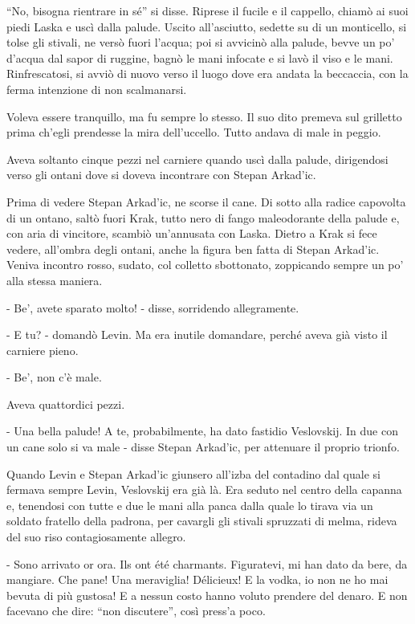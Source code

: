``No, bisogna rientrare in sé'' si disse. Riprese il fucile e il cappello, chiamò ai suoi piedi Laska e uscì dalla palude. Uscito all'asciutto, sedette su di un monticello, si tolse gli stivali, ne versò fuori l'acqua; poi si avvicinò alla palude, bevve un po' d'acqua dal sapor di ruggine, bagnò le mani infocate e si lavò il viso e le mani. Rinfrescatosi, si avviò di nuovo verso il luogo dove era andata la beccaccia, con la ferma intenzione di non scalmanarsi. 

Voleva essere tranquillo, ma fu sempre lo stesso. Il suo dito premeva sul grilletto prima ch'egli prendesse la mira dell'uccello. Tutto andava di male in peggio. 

Aveva soltanto cinque pezzi nel carniere quando uscì dalla palude, dirigendosi verso gli ontani dove si doveva incontrare con Stepan Arkad'ic. 

Prima di vedere Stepan Arkad'ic, ne scorse il cane. Di sotto alla radice capovolta di un ontano, saltò fuori Krak, tutto nero di fango maleodorante della palude e, con aria di vincitore, scambiò un'annusata con Laska. Dietro a Krak si fece vedere, all'ombra degli ontani, anche la figura ben fatta di Stepan Arkad'ic. Veniva incontro rosso, sudato, col colletto sbottonato, zoppicando sempre un po' alla stessa maniera. 

- Be', avete sparato molto! - disse, sorridendo allegramente. 

- E tu? - domandò Levin. Ma era inutile domandare, perché aveva già visto il carniere pieno. 

- Be', non c'è male. 

Aveva quattordici pezzi. 

- Una bella palude! A te, probabilmente, ha dato fastidio Veslovskij. In due con un cane solo si va male - disse Stepan Arkad'ic, per attenuare il proprio trionfo. 

\label{xi-5} 

Quando Levin e Stepan Arkad'ic giunsero all'izba del contadino dal quale si fermava sempre Levin, Veslovskij era già là. Era seduto nel centro della capanna e, tenendosi con tutte e due le mani alla panca dalla quale lo tirava via un soldato fratello della padrona, per cavargli gli stivali spruzzati di melma, rideva del suo riso contagiosamente allegro. 

- Sono arrivato or ora. Ils ont été charmants. Figuratevi, mi han dato da bere, da mangiare. Che pane! Una meraviglia! Délicieux! E la vodka, io non ne ho mai bevuta di più gustosa! E a nessun costo hanno voluto prendere del denaro. E non facevano che dire: ``non discutere'', così press'a poco. 

